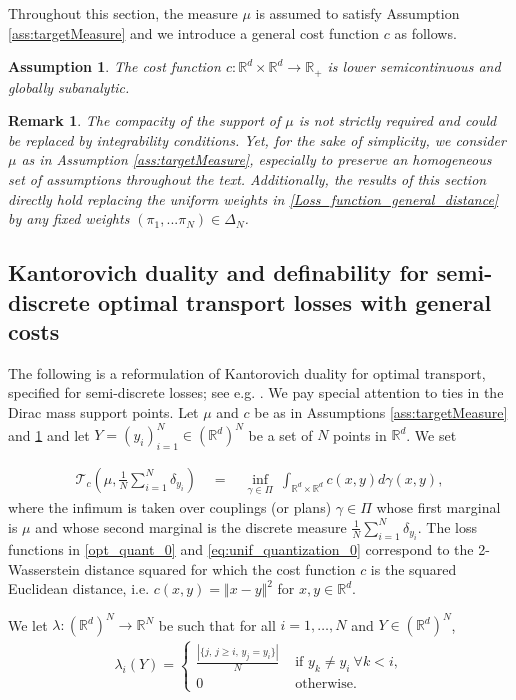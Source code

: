 \documentclass[11pt]{article}
\newcommand{\R}{\mathbb R}
\newcommand{\1}{\mathbbm{1}}
\newtheorem{rem}[lem]{Remark}
\newtheorem{assumption}{Assumption}
\numberwithin{equation}{section}
\begin{document}
Throughout this section, the measure $\mu$ is assumed to satisfy Assumption \ref{ass:targetMeasure} and we introduce a general cost function $c$ as follows.
\begin{assumption}
	\label{ass:costFunction}
    The cost function $c\colon \R^d \times \R^d \to \R_+$ is lower semicontinuous and globally subanalytic.
\end{assumption}
\begin{rem}
	The compacity of the support of $\mu$ is not strictly required and could be replaced by integrability conditions. Yet, for the sake of simplicity, we consider $\mu$ as in Assumption \ref{ass:targetMeasure}, especially to preserve an homogeneous set of assumptions throughout the text. Additionally, the results of this section directly hold replacing the uniform weights in \eqref{Loss_function_general_distance} by any fixed weights $(\pi_{1},...\pi_{N})\in \Delta_{N}$.
	\label{rem:integrability}
\end{rem}

\subsection{Kantorovich duality and definability for semi-discrete optimal transport losses with general costs}
\label{extension_general_cost}
The following is a reformulation of Kantorovich duality for optimal transport, specified for semi-discrete losses; see e.g. \cite[Theorem 5.9]{villanioptoldnew}. We pay special attention to ties in the Dirac mass support points.
Let $\mu$ and $c$ be as in Assumptions \ref{ass:targetMeasure} and \ref{ass:costFunction} and let $Y = (y_i)_{i=1}^N \in (\R^d)^N$ be a set of $N$ points in $\R^d$. We set 

\begin{align}
	\mathcal{T}_c \left(\mu, \frac{1}{N} \sum_{i=1}^N \delta_{y_i} \right) \quad = \quad \inf_{\gamma \in \Pi} \ \int_{\R^d \times \R^d} c(x,y) d\gamma (x,y),
	\label{eq:generalCostOptTransport}
\end{align}
where the infimum is taken over couplings (or plans) $\gamma\in\Pi$ whose first marginal is $\mu$ and whose second marginal is the discrete measure $\frac{1}{N}\sum_{i=1}^N \delta_{y_i}$. The loss functions in \eqref{opt_quant_0} and \eqref{eq:unif_quantization_0} correspond to the 2-Wasserstein distance squared for which the cost function $c$ is the squared Euclidean distance, i.e. $c(x,y) = \Vert x-y\Vert^2$ for $x,y\in\R^d$.

We let $\lambda \colon (\R^d)^N \to \R^N$ be such that for all $i = 1,\ldots, N$ and $Y\in(\mathbb{R}^d)^N$,
\begin{align}
	\lambda_i(Y) = \begin{cases}
		\frac{|\{j,\, j\geq i,\, y_j = y_i\}|}{N}& \text{ if } y_k \neq y_i\  \forall k<i, \\
		0&\text{ otherwise}.
	\end{cases}
	\label{eq:KantorovichDiagonalWeights}
\end{align}
\end{document}
